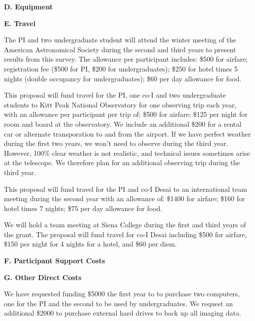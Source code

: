 \documentclass[preprint,11pt]{aastex}
\begin{document}
\begin{center}
{\bf \large D. Equipment}
\end{center}


\begin{center}
{\bf \large E. Travel}
\end{center}

The PI and
two undergraduate student will attend 
the winter meeting of the American Astronomical
Society during the second and third years to present results from this survey.  
The allowance per participant 
includes: \$500 for airfare; registration fee (\$500 for PI, 
\$200 for undergraduates); \$250 for hotel times 5 nights
(double occupancy for undergraduates); \$60 per day allowance for food.  

This proposal will fund travel for the PI, one co-I and two undergraduate students 
to Kitt Peak National Observatory for one observing trip each year, with an allowance 
per participant per trip of: \$500 for airfare;
\$125 per night for room and board at the observatory.
We include an additional \$200 for a rental car or 
alternate transporation to and from the airport.
If we have perfect weather during the first two years, we won't need
to observe during the third year.  However, 100\% clear weather is not
realistic, and technical issues sometimes arise at the telescope.  We
therefore plan for an additional observing trip during the third year.


This proposal will fund travel for the PI and co-I Desai to an international team
meeting during the second year with an allowance of:
\$1400 for airfare; \$160 for hotel times 7 nights;
\$75 per day allowance for food.

We will hold a team meeting at Siena College during the first and
third years of the grant.  
The proposal will fund travel for co-I Desai including
\$500 for airfare, \$150 per night for 4 nights for a hotel,
and \$60 per diem.  

\begin{center}
{\bf \large F. Participant Support Costs}
\end{center}

\begin{center}
{\bf \large G. Other Direct Costs}
\end{center}

We have requested funding \$5000 the first year to 
to purchase two computers, one for the PI and the second to be used by
undergraduates.  We request an additional \$2000 to purchase external
hard drives to back up all imaging data.
\end{document}
